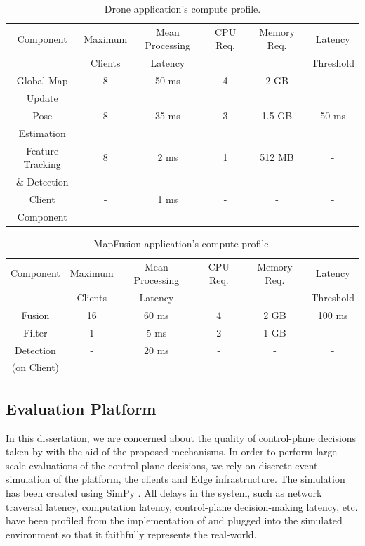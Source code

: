 \begin{table}[h!]
\centering
\begin{tabular}{||c | c | c | c | c | c ||} 
 \hline
 Component & Maximum & Mean Processing  & CPU Req. & Memory Req. & Latency  \\
 & Clients & Latency & & & Threshold \\
 \hline\hline
 Global Map & 8 & 50 ms & 4 & 2 GB & - \\
 Update & & & & & \\
 \hline
 Pose & 8 & 35 ms & 3 & 1.5 GB & 50 ms \\ 
 Estimation & & & & & \\
 \hline
 Feature Tracking & 8 & 2 ms & 1 & 512 MB & - \\
 \& Detection & & & & & \\
 \hline
 Client & - & 1 ms & - & - & - \\
 Component & & & & & \\
 \hline
\end{tabular}
\caption{Drone application's compute profile.}
\label{table:drone_profile}
\end{table}

\begin{table}[h!]
\centering
\begin{tabular}{||c | c | c | c | c | c ||} 
 \hline
 Component & Maximum & Mean Processing  & CPU Req. & Memory Req. & Latency  \\
 & Clients & Latency & & & Threshold \\
 \hline\hline
 Fusion & 16 & 60 ms & 4 & 2 GB & 100 ms \\
 \hline
 Filter & 1 & 5 ms & 2 & 1 GB & - \\ 
 \hline
 Detection & - & 20 ms & - & - & - \\
 (on Client) & & & & & \\
 \hline
\end{tabular}
\caption{MapFusion application's compute profile.}
\label{table:mapfusion_profile}
\end{table}

\subsection{Evaluation Platform}
In this dissertation, we are concerned about the quality of control-plane decisions taken by \oneedge{} with the aid of the proposed mechanisms. In order to perform large-scale evaluations of the control-plane decisions, we rely on discrete-event simulation of the \oneedge{} platform, the clients and Edge infrastructure. The simulation has been created using SimPy \cite{simpy}. All delays in the system, such as network traversal latency, computation latency, control-plane decision-making latency, etc. have been profiled from the implementation of \oneedge{} and plugged into the simulated environment so that it faithfully represents the real-world.


